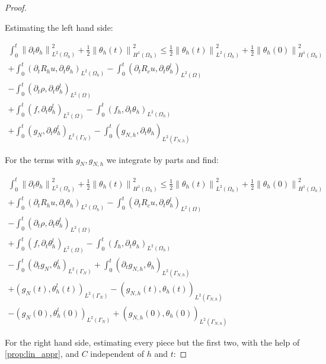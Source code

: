 \documentclass[english,a4paper,10pt,oneside]{scrbook}	%
\theoremstyle{break}
\newenvironment{mproof}[1][\proofname]{%
  \begin{proof}[#1]$ $\par\nobreak\ignorespaces
}{%
  \end{proof}
}
\renewcommand*{\proofname}{Proof}
\theoremstyle{remark}
\newcommand{\norm}[1]{\left\lVert#1\right\rVert}
\begin{document}
\begin{mproof}
Estimating the left hand side:

\begin{align*}
\int_0^t\norm{\partial_t \theta_h}^2_{L^2(\Omega_h)} + \frac{1}{2} \norm{\theta_h(t)}^2_{H^1(\Omega_h)} \leq  \frac{1}{2} \norm{\theta_h(t)}_{L^2(\Omega_h)}^2 + \frac{1}{2} \norm{\theta_h(0)}_{H^1(\Omega_h)}^2\\
+\int_0^t(\partial_t R_h u , \partial_t\theta_h)_{L^2(\Omega_h)} - \int_0^t(\partial_t R_c u , \partial_t\theta_h^l)_{L^2(\Omega)}\\
- \int_0^t(\partial_t \rho, \partial_t\theta_h^l)_{L^2(\Omega)}\\ + \int_0^t(f, \partial_t\theta_h^l)_{L^2(\Omega)} - \int_0^t(f_h, \partial_t\theta_h)_{L^2(\Omega_h)}\\ + \int_0^t(g_{N}, \partial_t\theta_h^l)_{L^2(\Gamma_{N})} - \int_0^t(g_{N,h}, \partial_t\theta_h)_{L^2(\Gamma_{N,h})} 
\end{align*}

For the terms with $g_N, g_{N,h}$ we integrate by parts and find:

\begin{align*}
\int_0^t\norm{\partial_t \theta_h}^2_{L^2(\Omega_h)} + \frac{1}{2} \norm{\theta_h(t)}_{H^1(\Omega_h)}^2 \leq  \frac{1}{2} \norm{\theta_h(t)}_{L^2(\Omega_h)}^2 + \frac{1}{2} \norm{\theta_h(0)}_{H^1(\Omega_h)}^2\\
+\int_0^t(\partial_t R_h u , \partial_t\theta_h)_{L^2(\Omega_h)} - \int_0^t(\partial_t R_c u , \partial_t\theta_h^l)_{L^2(\Omega)}\\
- \int_0^t(\partial_t \rho, \partial_t\theta_h^l)_{L^2(\Omega)}\\ + \int_0^t(f, \partial_t\theta_h^l)_{L^2(\Omega)} - \int_0^t(f_h, \partial_t\theta_h)_{L^2(\Omega_h)}\\ 
-\int_0^t( \partial_t g_{N},\theta_h^l)_{L^2(\Gamma_{N})} + \int_0^t( \partial_t g_{N,h},\theta_h)_{L^2(\Gamma_{N,h})}\\
+ (g_{N}(t) ,\theta_h^l(t))_{L^2(\Gamma_{N})} - ( g_{N,h}(t),\theta_h(t))_{L^2(\Gamma_{N,h})}\\
-(g_{N}(0) ,\theta_h^l(0))_{L^2(\Gamma_{N})} + ( g_{N,h}(0),\theta_h(0))_{L^2(\Gamma_{N,h})}
\end{align*}

For the right hand side, estimating every piece but the first two, with the help of \ref{prop:lin_appr}, and $C$ independent of $h$ and $t$: 


\end{mproof}
\end{document}
